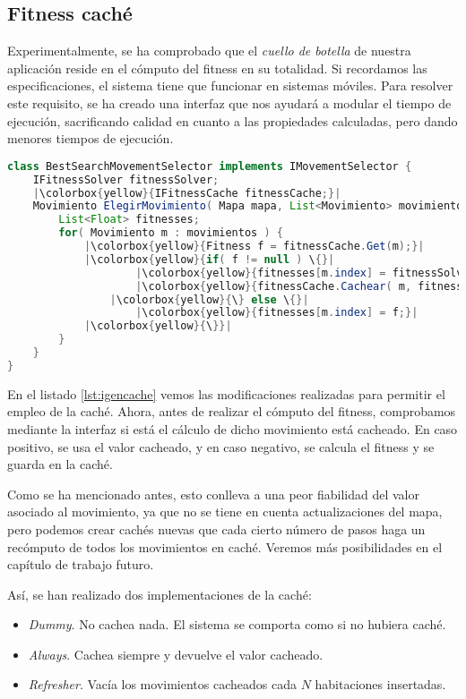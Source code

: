 \subsection{Fitness caché}

Experimentalmente, se ha comprobado que el \emph{cuello de botella} de nuestra aplicación reside en el cómputo del fitness en su totalidad. Si recordamos las especificaciones, el sistema tiene que funcionar en sistemas móviles. Para resolver este requisito, se ha creado una interfaz que nos ayudará a modular el tiempo de ejecución, sacrificando calidad en cuanto a las propiedades calculadas, pero dando menores tiempos de ejecución.

\begin{lstlisting}[caption={Interfaz de selección de movimiento basada en búsqueda con mejora de caché},label={lst:igencache},language=Java,escapechar=|]
class BestSearchMovementSelector implements IMovementSelector {
	IFitnessSolver fitnessSolver;
	|\colorbox{yellow}{IFitnessCache fitnessCache;}|
	Movimiento ElegirMovimiento( Mapa mapa, List<Movimiento> movimientos ) {
		List<Float> fitnesses;
		for( Movimiento m : movimientos ) {
			|\colorbox{yellow}{Fitness f = fitnessCache.Get(m);}|
			|\colorbox{yellow}{if( f != null ) \{}|
					|\colorbox{yellow}{fitnesses[m.index] = fitnessSolver.FuncionGuia( mapa, m );}|
					|\colorbox{yellow}{fitnessCache.Cachear( m, fitnesses[m.index] );}|
				|\colorbox{yellow}{\} else \{}|
					|\colorbox{yellow}{fitnesses[m.index] = f;}|
			|\colorbox{yellow}{\}}|
		}
	}
}
\end{lstlisting}


En el listado \ref{lst:igencache} vemos las modificaciones realizadas para permitir el empleo de la caché. Ahora, antes de realizar el cómputo del fitness, comprobamos mediante la interfaz si está el cálculo de dicho movimiento está cacheado. En caso positivo, se usa el valor cacheado, y en caso negativo, se calcula el fitness y se guarda en la caché.

Como se ha mencionado antes, esto conlleva a una peor fiabilidad del valor asociado al movimiento, ya que no se tiene en cuenta actualizaciones del mapa, pero podemos crear cachés nuevas que cada cierto número de pasos haga un recómputo de todos los movimientos en caché. Veremos más posibilidades en el capítulo de trabajo futuro.

Así, se han realizado dos implementaciones de la caché:

\begin{itemize}
	\item \emph{Dummy}. No cachea nada. El sistema se comporta como si no hubiera caché.
	\item \emph{Always}. Cachea siempre y devuelve el valor cacheado.
	\item \emph{Refresher}. Vacía los movimientos cacheados cada $N$ habitaciones insertadas.
\end{itemize}

